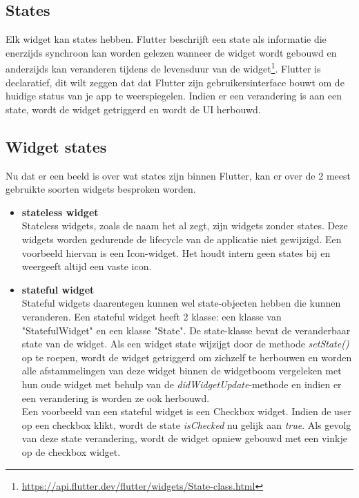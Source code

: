 \subsection[states]{States}
\label{sec:States}
Elk widget kan states hebben. Flutter beschrijft een state als informatie die enerzijds synchroon kan worden gelezen wanneer de widget wordt gebouwd en anderzijds
kan veranderen tijdens de levensduur van de widget\footnote{\url{https://api.flutter.dev/flutter/widgets/State-class.html}}. Flutter is declaratief, dit wilt zeggen dat dat Flutter zijn gebruikersinterface bouwt om de huidige status van je app te weerspiegelen.
Indien er een verandering is aan een state, wordt de widget getriggerd en wordt de UI herbouwd.


\subsection[widget states]{Widget states}
\label{sec:Widget states}
Nu dat er een beeld is over wat states zijn binnen Flutter, kan er over de 2 meest gebruikte soorten widgets besproken worden. 
 \begin{itemize}
     \item \textbf{stateless widget} 
     \\
     Stateless widgets, zoals de naam het al zegt, zijn widgets zonder states. Deze widgets worden gedurende de lifecycle van de applicatie niet gewijzigd. Een voorbeeld hiervan is een Icon-widget. Het houdt intern geen states bij en weergeeft altijd een vaste icon.
     \item  \textbf{stateful widget} 
    \\
     Stateful widgets daarentegen kunnen wel state-objecten hebben die kunnen veranderen. Een stateful widget heeft 2 klasse: een klasse van "StatefulWidget" en een klasse "State".
     De state-klasse bevat de veranderbaar state van de widget. Als een widget state wijzijgt door de methode \textit{setState()}  op te roepen, wordt de widget getriggerd om zichzelf te herbouwen en worden alle afstammelingen van deze widget binnen de widgetboom vergeleken met 
     hun oude widget met behulp van de \textit{didWidgetUpdate}-methode en indien er een verandering is worden ze ook herbouwd. 
     \\
     Een voorbeeld van een stateful widget is een Checkbox widget. Indien de user op een checkbox klikt, wordt de state \textit{isChecked} nu gelijk aan \textit{true}. Als gevolg van deze state verandering, wordt de widget opniew gebouwd met een vinkje op de checkbox widget.
\end{itemize}
